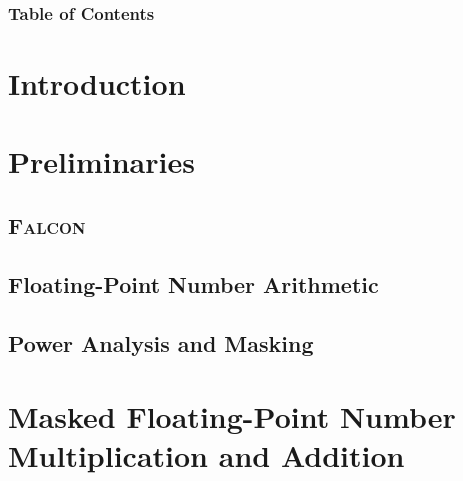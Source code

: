 

\usepackage[
    backend=biber,
    style=alphabetic,
    sorting=ynt
]{biblatex}


\renewcommand*{\bibfont}{\scriptsize}





\begin{frame}
\maketitle
\end{frame}



\begin{frame}
\frametitle{Table of Contents}
\tableofcontents[hideothersubsections]

\end{frame}


\section{Introduction}




\section{Preliminaries}

\subsection{\textsc{Falcon}}


\subsection{Floating-Point Number Arithmetic}


\subsection{Power Analysis and Masking}

%

\section{Masked Floating-Point Number Multiplication and Addition}
